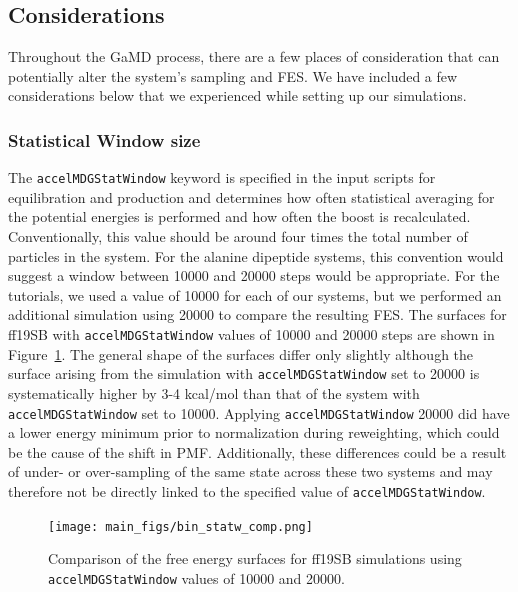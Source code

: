 \documentclass[9pt,tutorial]{livecoms}
\begin{document}
\subsection{Considerations}
Throughout the GaMD process, there are a few places of consideration that can potentially alter the system's sampling and FES. We have included a few considerations below that we experienced while setting up our simulations.

\subsubsection{Statistical Window size} 
The \texttt{accelMDGStatWindow} keyword is specified in the input scripts for equilibration and production and determines how often statistical averaging for the potential energies is performed and how often the boost is recalculated. Conventionally, this value should be around four times the total number of particles in the system. For the alanine dipeptide systems, this convention would suggest a window between 10000 and 20000 steps would be appropriate. For the tutorials, we used a value of 10000 for each of our systems, but we performed an additional simulation using 20000 to compare the resulting FES. The surfaces for ff19SB with \texttt{accelMDGStatWindow} values of 10000 and 20000 steps are shown in Figure~\ref{fig:binstatw}. The general shape of the surfaces differ only slightly although the surface arising from the simulation with \texttt{accelMDGStatWindow} set to 20000 is systematically higher by 3-4 kcal/mol than that of  the system with \texttt{accelMDGStatWindow} set to 10000. Applying \texttt{accelMDGStatWindow} 20000 did have a lower energy minimum prior to normalization during reweighting, which could be the cause of the shift in PMF. Additionally, these differences could be a result of under- or over-sampling of the same state across these two systems and may therefore not be directly linked to the specified value of \texttt{accelMDGStatWindow}. 

\begin{figure}[h]
    \texttt{[image: main\_figs/bin\_statw\_comp.png]}
    \caption{Comparison of the free energy surfaces for ff19SB simulations using \texttt{accelMDGStatWindow} values of 10000 and 20000.}
    \label{fig:binstatw}
\end{figure}
\end{document}
